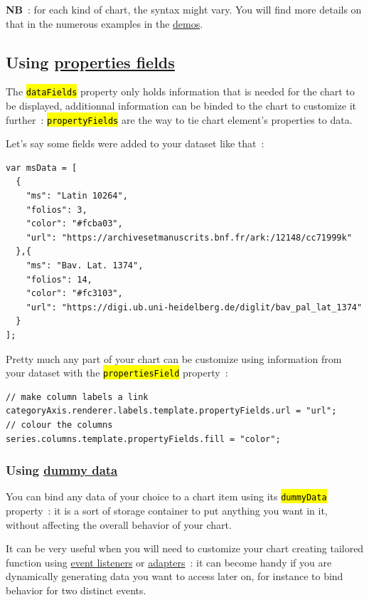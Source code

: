 \documentclass[a4paper,12pt,twoside]{book}
\let\OldTexttt\texttt
\renewcommand{\texttt}[1]{\OldTexttt{\hl{#1}}}
\begin{document}
\textbf{NB}~: for each kind of chart, the syntax might vary. You will find more details on that in the numerous examples in the \href{https://www.amcharts.com/demos/}{demos}.

				\subsection{Using \href{https://www.amcharts.com/docs/v4/concepts/data/\#Property_fields}{properties fields}}\label{using-propertiesfields}

The \texttt{dataFields} property only holds information that is needed for the chart to be displayed, additionnal information can be binded to the chart to customize it further~: \texttt{propertyFields} are the way to tie chart element's properties to data.

Let's say some fields were added to your dataset like that~:

\begin{lstlisting}
var msData = [
  {
    "ms": "Latin 10264",
    "folios": 3,
    "color": "#fcba03",
    "url": "https://archivesetmanuscrits.bnf.fr/ark:/12148/cc71999k"
  },{
    "ms": "Bav. Lat. 1374",
    "folios": 14,
    "color": "#fc3103",
    "url": "https://digi.ub.uni-heidelberg.de/diglit/bav_pal_lat_1374"
  }
];
\end{lstlisting}

Pretty much any part of your chart can be customize using information from your dataset with the \texttt{propertiesField} property~:

\begin{lstlisting}
// make column labels a link
categoryAxis.renderer.labels.template.propertyFields.url = "url";
// colour the columns
series.columns.template.propertyFields.fill = "color";
\end{lstlisting}

				\subsubsection{Using \href{https://www.amcharts.com/docs/v4/concepts/data/\#Using_dummy_data_}{dummy data}}\label{using-dummydata}

You can bind any data of your choice to a chart item using its \texttt{dummyData} property~: it is a sort of storage container to put anything you want in it, without affecting the overall behavior of your chart.

It can be very useful when you will need to customize your chart creating tailored function using \href{https://www.amcharts.com/docs/v4/concepts/event-listeners/}{event listeners} or \href{https://www.amcharts.com/docs/v4/concepts/adapters/}{adapters}~: it can become handy if you are dynamically generating data you want to access later on, for instance to bind behavior for two distinct events.
\end{document}
